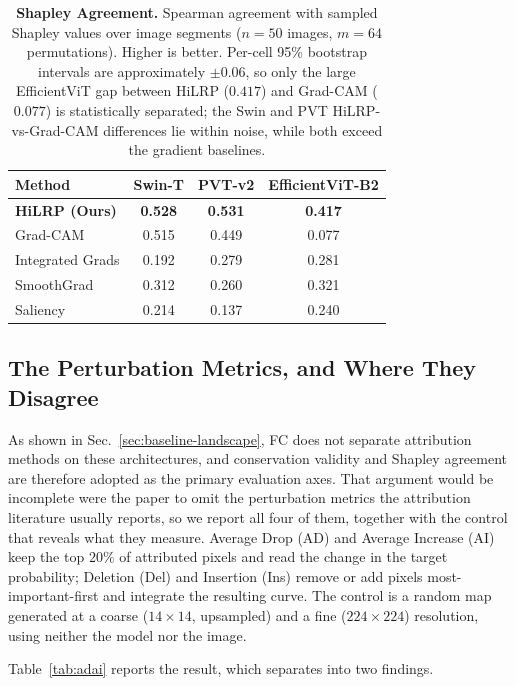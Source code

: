 \documentclass[lettersize,journal]{IEEEtran}
\theoremstyle{definition}
\theoremstyle{plain}
\begin{document}
\begin{table}[!tbp]
  \centering
  \caption{\textbf{Shapley Agreement.} Spearman agreement with sampled Shapley values over image segments ($n{=}50$ images, $m{=}64$ permutations). Higher is better. Per-cell 95\% bootstrap intervals are approximately $\pm0.06$, so only the large EfficientViT gap between HiLRP ($0.417$) and Grad-CAM ($0.077$) is statistically separated; the Swin and PVT HiLRP-vs-Grad-CAM differences lie within noise, while both exceed the gradient baselines.}
  \label{tab:shapley}
  \setlength{\tabcolsep}{5pt}
  \begin{tabular}{l c c c}
    \toprule
    Method & Swin-T & PVT-v2 & EfficientViT-B2 \\
    \midrule
    \textbf{HiLRP (Ours)} & \textbf{0.528} & \textbf{0.531} & \textbf{0.417} \\
    Grad-CAM & 0.515 & 0.449 & 0.077 \\
    Integrated Grads & 0.192 & 0.279 & 0.281 \\
    SmoothGrad & 0.312 & 0.260 & 0.321 \\
    Saliency & 0.214 & 0.137 & 0.240 \\
    \bottomrule
  \end{tabular}
\end{table}

\subsection{The Perturbation Metrics, and Where They Disagree}
\label{sec:perturbation-metrics}
As shown in Sec.~\ref{sec:baseline-landscape}, FC does not
separate attribution methods on these architectures, and conservation validity
and Shapley agreement are therefore adopted as the primary evaluation axes. That argument would be incomplete were the paper to omit
the perturbation metrics the attribution literature usually reports, so we
report all four of them, together with the control that reveals what they
measure. Average Drop (AD) and Average Increase (AI) keep the top $20\%$ of
attributed pixels and read the change in the target probability; Deletion (Del)
and Insertion (Ins) remove or add pixels most-important-first and integrate the
resulting curve. The
control is a random map generated at a coarse ($14{\times}14$, upsampled) and a
fine ($224{\times}224$) resolution, using neither the model nor the image.

Table~\ref{tab:adai} reports the result, which separates into two findings.
\end{document}
